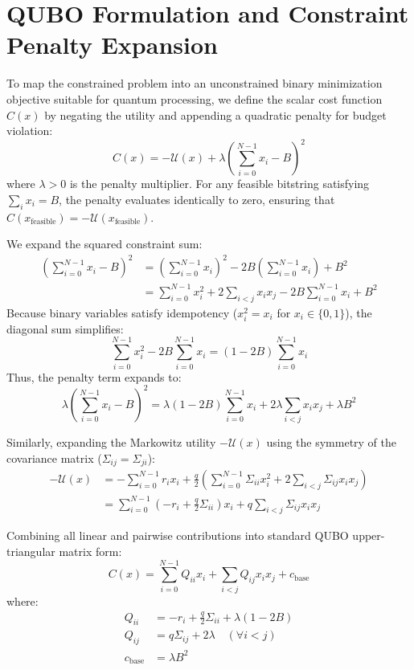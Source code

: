 \section{QUBO Formulation and Constraint Penalty Expansion}
To map the constrained problem into an unconstrained binary minimization objective suitable for quantum processing, we define the scalar cost function $C(x)$ by negating the utility and appending a quadratic penalty for budget violation:
\begin{equation}
\label{eq:cost_function}
C(x) = -\mathcal{U}(x) + \lambda \left( \sum_{i=0}^{N-1} x_i - B \right)^2
\end{equation}
where $\lambda > 0$ is the penalty multiplier. For any feasible bitstring satisfying $\sum_i x_i = B$, the penalty evaluates identically to zero, ensuring that $C(x_{\text{feasible}}) = -\mathcal{U}(x_{\text{feasible}})$.

We expand the squared constraint sum:
\begin{align}
\left( \sum_{i=0}^{N-1} x_i - B \right)^2 &= \left( \sum_{i=0}^{N-1} x_i \right)^2 - 2B \left( \sum_{i=0}^{N-1} x_i \right) + B^2 \nonumber \\
&= \sum_{i=0}^{N-1} x_i^2 + 2 \sum_{i < j} x_i x_j - 2B \sum_{i=0}^{N-1} x_i + B^2
\end{align}
Because binary variables satisfy idempotency ($x_i^2 = x_i$ for $x_i \in \{0, 1\}$), the diagonal sum simplifies:
\begin{equation}
\sum_{i=0}^{N-1} x_i^2 - 2B \sum_{i=0}^{N-1} x_i = (1 - 2B) \sum_{i=0}^{N-1} x_i
\end{equation}
Thus, the penalty term expands to:
\begin{equation}
\label{eq:penalty_expansion}
\lambda \left( \sum_{i=0}^{N-1} x_i - B \right)^2 = \lambda (1 - 2B) \sum_{i=0}^{N-1} x_i + 2\lambda \sum_{i < j} x_i x_j + \lambda B^2
\end{equation}

Similarly, expanding the Markowitz utility $-\mathcal{U}(x)$ using the symmetry of the covariance matrix ($\Sigma_{ij} = \Sigma_{ji}$):
\begin{align}
-\mathcal{U}(x) &= -\sum_{i=0}^{N-1} r_i x_i + \frac{q}{2} \left( \sum_{i=0}^{N-1} \Sigma_{ii} x_i^2 + 2 \sum_{i < j} \Sigma_{ij} x_i x_j \right) \nonumber \\
&= \sum_{i=0}^{N-1} \left( -r_i + \frac{q}{2} \Sigma_{ii} \right) x_i + q \sum_{i < j} \Sigma_{ij} x_i x_j
\end{align}

Combining all linear and pairwise contributions into standard QUBO upper-triangular matrix form:
\begin{equation}
\label{eq:qubo_standard_form}
C(x) = \sum_{i=0}^{N-1} Q_{ii} x_i + \sum_{i < j} Q_{ij} x_i x_j + c_{\text{base}}
\end{equation}
where:
\begin{align}
Q_{ii} &= -r_i + \frac{q}{2} \Sigma_{ii} + \lambda (1 - 2B) \label{eq:q_diag} \\
Q_{ij} &= q \Sigma_{ij} + 2\lambda \quad (\forall i < j) \label{eq:q_ij} \\
c_{\text{base}} &= \lambda B^2 \label{eq:c_base}
\end{align}

